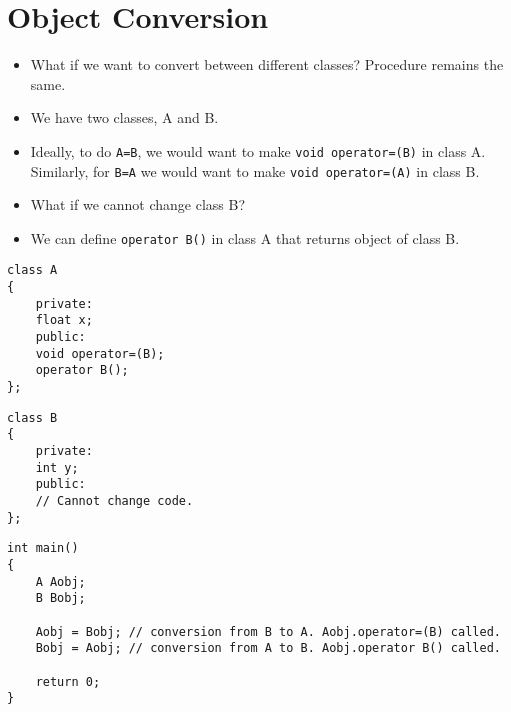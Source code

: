 \documentclass[12pt,a4paper]{article}
\begin{document}
\section{Object Conversion}
\begin{itemize}
\item What if we want to convert between different classes? Procedure remains the same.
\item We have two classes, A and B.
\item Ideally, to do \verb|A=B|, we would want to make \verb|void operator=(B)| in class A. Similarly, for \verb|B=A| we would want to make \verb|void operator=(A)| in class B.
\item What if we cannot change class B?
\item We can define \verb|operator B()| in class A that returns object of class B.
\end{itemize}
\begin{minipage}{7.5cm}
\begin{lstlisting}[caption={class A}]
class A
{
	private:
	float x;
	public:
	void operator=(B);
	operator B();
};
\end{lstlisting}
\end{minipage}
\hspace*{1cm}
\begin{minipage}{7.5cm}
\begin{lstlisting}[caption={class B}]
class B
{
	private:
	int y;
	public:
	// Cannot change code.
};
\end{lstlisting}
\end{minipage}
\begin{lstlisting}[caption={Object Conversion}]
int main()
{
	A Aobj;
	B Bobj;
	
	Aobj = Bobj; // conversion from B to A. Aobj.operator=(B) called.
	Bobj = Aobj; // conversion from A to B. Aobj.operator B() called.

	return 0;
}
\end{lstlisting}


\end{document}
